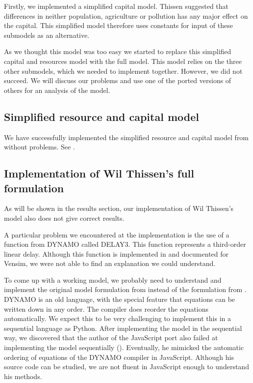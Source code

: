 \documentclass[10pt,a4paper]{scrartcl}
\begin{document}
Firstly, we implemented a simplified capital model. Thissen suggested that differences in neither population, agriculture or pollution has any major effect on the capital. This simplified model therefore uses constants for input of these submodels as an alternative.

As we thought this model was too easy we started to replace this simplified capital and resources model with the full model. This model relies on the three other submodels, which we needed to implement together. However, we did not succeed. We will discuss our problems and use one of the ported versions of others for an analysis of the model.

\subsection*{Simplified resource and capital model}

We have successfully implemented the simplified resource and capital model from \cite{thissen1978investigations} without problems. See .

\subsection*{Implementation of Wil Thissen's full formulation}

As will be shown in the results section, our implementation of Wil Thissen's model also does not give correct results.

A particular problem we encountered at the implementation is the use of a function from DYNAMO called DELAY3. This function represents a third-order linear delay. Although this function is implemented in and documented for Vensim, we were not able to find an explanation we could understand.

To come up with a working model, we probably need to understand and implement the original model formulation from \cite{forresterworld} instead of the formulation from \cite{thissen1978investigations}. DYNAMO is an old language, with the special feature that equations can be written down in any order. The compiler does reorder the equations automatically. We expect this to be very challenging to implement this in a sequential language as Python.  After implementing the model in the sequential way, we discovered that the author of the JavaScript port also failed at implementing the model sequentially (\cite{blogpost}). Eventually, he mimicked the automatic ordering of equations of the DYNAMO compiler in JavaScript. Although his source code can be studied, we are not fluent in JavaScript enough to understand his methods.
\end{document}

